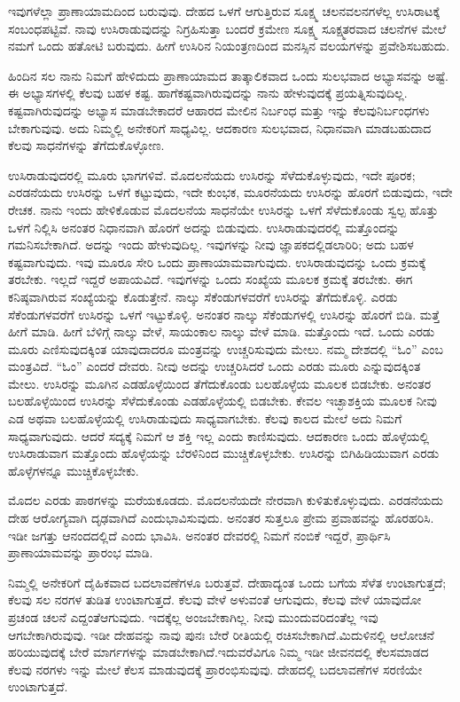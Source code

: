 ಇವುಗಳೆಲ್ಲಾ ಪ್ರಾಣಾಯಾಮದಿಂದ ಬರುವುವು. ದೇಹದ ಒಳಗೆ ಆಗುತ್ತಿರುವ ಸೂಕ್ಷ್ಮ ಚಲನವಲನಗಳೆಲ್ಲ ಉಸಿರಾಟಕ್ಕೆ ಸಂಬಂಧಪಟ್ಟಿವೆ. ನಾವು ಉಸಿರಾಡುವುದನ್ನು ನಿಗ್ರಹಿಸುತ್ತಾ ಬಂದರೆ ಕ್ರಮೇಣ ಸೂಕ್ಷ್ಮ ಸೂಕ್ಷ್ಮತರವಾದ ಚಲನೆಗಳ ಮೇಲೆ ನಮಗೆ ಒಂದು ಹತೋಟಿ ಬರುವುದು. ಹೀಗೆ ಉಸಿರಿನ ನಿಯಂತ್ರಣದಿಂದ ಮನಸ್ಸಿನ ವಲಯಗಳನ್ನು ಪ್ರವೇಶಿಸಬಹುದು.

ಹಿಂದಿನ ಸಲ ನಾನು ನಿಮಗೆ ಹೇಳಿದುದು ಪ್ರಾಣಾಯಾಮದ ತಾತ್ಕಾಲಿಕವಾದ ಒಂದು ಸುಲಭವಾದ ಅಭ್ಯಾಸವನ್ನು ಅಷ್ಟೆ. ಈ ಅಭ್ಯಾಸಗಳಲ್ಲಿ ಕೆಲವು ಬಹಳ ಕಷ್ಟ. ಹಾಗೆ\break ಕಷ್ಟವಾಗಿರುವುದನ್ನು ನಾನು ಹೇಳುವುದಕ್ಕೆ ಪ್ರಯತ್ನಿಸುವುದಿಲ್ಲ. ಕಷ್ಟವಾಗಿರುವುದನ್ನು ಅಭ್ಯಾಸ ಮಾಡಬೇಕಾದರೆ ಆಹಾರದ ಮೇಲಿನ ನಿರ್ಬಂಧ ಮತ್ತು ಇನ್ನು ಕೆಲವು\break ನಿರ್ಬಂಧಗಳು ಬೇಕಾಗುವುವು. ಅದು ನಿಮ್ಮಲ್ಲಿ ಅನೇಕರಿಗೆ ಸಾಧ್ಯವಿಲ್ಲ. ಆದಕಾರಣ ಸುಲಭವಾದ, ನಿಧಾನವಾಗಿ ಮಾಡಬಹುದಾದ ಕೆಲವು ಸಾಧನೆಗಳನ್ನು ತೆಗೆದುಕೊಳ್ಳೋಣ.

ಉಸಿರಾಡುವುದರಲ್ಲಿ ಮೂರು ಭಾಗಗಳಿವೆ. ಮೊದಲನೆಯದು ಉಸಿರನ್ನು ಸೆಳೆದುಕೊಳ್ಳುವುದು, ಇದೇ ಪೂರಕ; ಎರಡನೆಯದು ಉಸಿರನ್ನು ಒಳಗೆ ಕಟ್ಟುವುದು, ಇದೇ ಕುಂಭಕ, ಮೂರನೆಯದು ಉಸಿರನ್ನು ಹೊರಗೆ ಬಿಡುವುದು, ಇದೇ ರೇಚಕ. ನಾನು ಇಂದು ಹೇಳಿಕೊಡುವ ಮೊದಲನೆಯ ಸಾಧನೆಯೇ ಉಸಿರನ್ನು ಒಳಗೆ ಸೆಳೆದುಕೊಂಡು ಸ್ವಲ್ಪ ಹೊತ್ತು ಒಳಗೆ ನಿಲ್ಲಿಸಿ ಅನಂತರ ನಿಧಾನವಾಗಿ ಹೊರಗೆ ಅದನ್ನು ಬಿಡುವುದು. ಉಸಿರಾಡುವುದರಲ್ಲಿ ಮತ್ತೊಂದನ್ನು ಗಮನಿಸಬೇಕಾಗಿದೆ. ಅದನ್ನು ಇಂದು ಹೇಳುವುದಿಲ್ಲ. ಇವುಗಳನ್ನು ನೀವು ಜ್ಞಾಪಕದಲ್ಲಿಡಲಾರಿರಿ; ಅದು ಬಹಳ ಕಷ್ಟವಾಗುವುದು. ಇವು ಮೂರೂ ಸೇರಿ ಒಂದು ಪ್ರಾಣಾಯಾಮವಾಗುವುದು. ಉಸಿರಾಡುವುದನ್ನು ಒಂದು ಕ್ರಮಕ್ಕೆ ತರಬೇಕು. ಇಲ್ಲದೆ ಇದ್ದರೆ ಅಪಾಯವಿದೆ. ಇವುಗಳನ್ನು ಒಂದು ಸಂಖ್ಯೆಯ ಮೂಲಕ ಕ್ರಮಕ್ಕೆ ತರಬೇಕು. ಈಗ ಕನಿಷ್ಠವಾಗಿರುವ ಸಂಖ್ಯೆಯನ್ನು ಕೊಡುತ್ತೇನೆ. ನಾಲ್ಕು ಸೆಕೆಂಡುಗಳವರೆಗೆ ಉಸಿರನ್ನು ತೆಗೆದುಕೊಳ್ಳಿ. ಎರಡು ಸೆಕೆಂಡುಗಳವರೆಗೆ ಉಸಿರನ್ನು ಒಳಗೆ ಇಟ್ಟುಕೊಳ್ಳಿ. ಅನಂತರ ನಾಲ್ಕು ಸೆಕೆಂಡುಗಳಲ್ಲಿ ಉಸಿರನ್ನು ಹೊರಗೆ ಬಿಡಿ. ಮತ್ತೆ ಹೀಗೆ ಮಾಡಿ. ಹೀಗೆ ಬೆಳಿಗ್ಗೆ ನಾಲ್ಕು ವೇಳೆ, ಸಾಯಂಕಾಲ ನಾಲ್ಕು ವೇಳೆ ಮಾಡಿ. ಮತ್ತೊಂದು ಇದೆ. ಒಂದು ಎರಡು ಮೂರು ಎಣಿಸುವುದಕ್ಕಿಂತ ಯಾವುದಾದರೂ ಮಂತ್ರವನ್ನು ಉಚ್ಚರಿಸುವುದು ಮೇಲು. ನಮ್ಮ ದೇಶದಲ್ಲಿ “ಓಂ” ಎಂಬ ಮಂತ್ರವಿದೆ. “ಓಂ” ಎಂದರೆ ದೇವರು. ನೀವು ಅದನ್ನು ಉಚ್ಚರಿಸಿದರೆ ಒಂದು ಎರಡು ಮೂರು ಎನ್ನುವುದಕ್ಕಿಂತ ಮೇಲು. ಉಸಿರನ್ನು ಮೂಗಿನ ಎಡಹೊಳ್ಳೆಯಿಂದ ತೆಗೆದುಕೊಂಡು ಬಲಹೊಳ್ಳೆಯ ಮೂಲಕ ಬಿಡಬೇಕು. ಅನಂತರ ಬಲಹೊಳ್ಳೆಯಿಂದ ಉಸಿರನ್ನು ಸೆಳೆದುಕೊಂಡು ಎಡಹೊಳ್ಳೆಯಲ್ಲಿ ಬಿಡಬೇಕು. ಕೇವಲ ಇಚ್ಛಾಶಕ್ತಿಯ ಮೂಲಕ ನೀವು ಎಡ ಅಥವಾ ಬಲಹೊಳ್ಳೆಯಲ್ಲಿ ಉಸಿರಾಡುವುದು ಸಾಧ್ಯವಾಗಬೇಕು. ಕೆಲವು ಕಾಲದ ಮೇಲೆ ಅದು ನಿಮಗೆ ಸಾಧ್ಯವಾಗುವುದು. ಆದರೆ ಸದ್ಯಕ್ಕೆ ನಿಮಗೆ ಆ ಶಕ್ತಿ ಇಲ್ಲ ಎಂದು ಕಾಣಿಸುವುದು. ಆದಕಾರಣ ಒಂದು ಹೊಳ್ಳೆಯಲ್ಲಿ ಉಸಿರಾಡುವಾಗ ಮತ್ತೊಂದು ಹೊಳ್ಳೆಯನ್ನು ಬೆರಳಿನಿಂದ ಮುಚ್ಚಿಕೊಳ್ಳಬೇಕು. ಉಸಿರನ್ನು ಬಿಗಿಹಿಡಿಯುವಾಗ ಎರಡು ಹೊಳ್ಳೆಗಳನ್ನೂ ಮುಚ್ಚಿಕೊಳ್ಳಬೇಕು.

ಮೊದಲ ಎರಡು ಪಾಠಗಳನ್ನು ಮರೆಯಕೂಡದು. ಮೊದಲನೆಯದೇ ನೇರವಾಗಿ ಕುಳಿತುಕೊಳ್ಳುವುದು. ಎರಡನೆಯದು ದೇಹ ಆರೋಗ್ಯವಾಗಿ ದೃಢವಾಗಿದೆ ಎಂದು\break ಭಾವಿಸುವುದು. ಅನಂತರ ಸುತ್ತಲೂ ಪ್ರೇಮ ಪ್ರವಾಹವನ್ನು ಹೊರಹರಿಸಿ. ಇಡೀ ಜಗತ್ತು ಆನಂದದಲ್ಲಿದೆ ಎಂದು ಭಾವಿಸಿ. ಅನಂತರ ದೇವರಲ್ಲಿ ನಿಮಗೆ ನಂಬಿಕೆ ಇದ್ದರೆ, ಪ್ರಾರ್ಥಿಸಿ ಪ್ರಾಣಾಯಾಮವನ್ನು ಪ್ರಾರಂಭ ಮಾಡಿ.

ನಿಮ್ಮಲ್ಲಿ ಅನೇಕರಿಗೆ ದೈಹಿಕವಾದ ಬದಲಾವಣೆಗಳೂ ಬರುತ್ತವೆ. ದೇಹಾದ್ಯಂತ ಒಂದು ಬಗೆಯ ಸೆಳೆತ ಉಂಟಾಗುತ್ತದೆ; ಕೆಲವು ಸಲ ನರಗಳ ತುಡಿತ ಉಂಟಾಗುತ್ತದೆ. ಕೆಲವು ವೇಳೆ ಅಳುವಂತೆ ಆಗುವುದು, ಕೆಲವು ವೇಳೆ ಯಾವುದೋ ಪ್ರಚಂಡ ಚಲನೆ ಎದ್ದಂತೆ\break ಆಗುವುದು. ಇದಕ್ಕೆಲ್ಲ ಅಂಜಬೇಕಾಗಿಲ್ಲ. ನೀವು ಮುಂದುವರಿದಂತೆಲ್ಲ ಇವು ಆಗಬೇಕಾ\break ಗಿರುವುವು. ಇಡೀ ದೇಹವನ್ನು ನಾವು ಪುನಃ ಬೇರೆ ರೀತಿಯಲ್ಲಿ ರಚಿಸಬೇಕಾಗಿದೆ.\break ಮಿದುಳಿನಲ್ಲಿ ಆಲೋಚನೆ ಹರಿಯುವುದಕ್ಕೆ ಬೇರೆ ಮಾರ್ಗಗಳನ್ನು ಮಾಡಬೇಕಾಗಿದೆ.\break ಇದುವರೆವಿಗೂ ನಿಮ್ಮ ಇಡೀ ಜೀವನದಲ್ಲಿ ಕೆಲಸಮಾಡದ ಕೆಲವು ನರಗಳು ಇನ್ನು ಮೇಲೆ ಕೆಲಸ ಮಾಡುವುದಕ್ಕೆ ಪ್ರಾರಂಭಿಸುವುವು. ದೇಹದಲ್ಲಿ ಬದಲಾವಣೆಗಳ ಸರಣಿಯೇ ಉಂಟಾಗುತ್ತದೆ.

